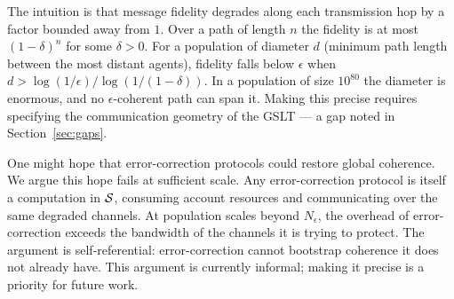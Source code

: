 \begin{remark}
The intuition is that message fidelity degrades along each
transmission hop by a factor bounded away from $1$.
Over a path of length $n$ the fidelity is at most $(1-\delta)^n$
for some $\delta > 0$.
For a population of diameter $d$ (minimum path length between
the most distant agents), fidelity falls below $\epsilon$ when
$d > \log(1/\epsilon) / \log(1/(1-\delta))$.
In a population of size $10^{80}$ the diameter is enormous,
and no $\epsilon$-coherent path can span it.
Making this precise requires specifying the communication geometry
of the GSLT --- a gap noted in Section~\ref{sec:gaps}.
\end{remark}

\begin{remark}
One might hope that error-correction protocols could restore
global coherence.
We argue this hope fails at sufficient scale.
Any error-correction protocol is itself a computation in $\mathcal{S}$,
consuming account resources and communicating over the same
degraded channels.
At population scales beyond $N_\epsilon$, the overhead of
error-correction exceeds the bandwidth of the channels it is trying
to protect.
The argument is self-referential: error-correction cannot bootstrap
coherence it does not already have.
This argument is currently informal; making it precise is a
priority for future work.
\end{remark}

